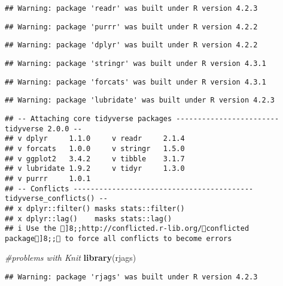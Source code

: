\documentclass[
]{article}
\newenvironment{Shaded}{\begin{snugshade}}{\end{snugshade}}
\newcommand{\CommentTok}[1]{\textcolor[rgb]{0.56,0.35,0.01}{\textit{#1}}}
\newcommand{\FunctionTok}[1]{\textcolor[rgb]{0.13,0.29,0.53}{\textbf{#1}}}
\newcommand{\NormalTok}[1]{#1}
\newcommand{\StringTok}[1]{\textcolor[rgb]{0.31,0.60,0.02}{#1}}
\begin{document}
\begin{verbatim}
## Warning: package 'readr' was built under R version 4.2.3
\end{verbatim}

\begin{verbatim}
## Warning: package 'purrr' was built under R version 4.2.2
\end{verbatim}

\begin{verbatim}
## Warning: package 'dplyr' was built under R version 4.2.2
\end{verbatim}

\begin{verbatim}
## Warning: package 'stringr' was built under R version 4.3.1
\end{verbatim}

\begin{verbatim}
## Warning: package 'forcats' was built under R version 4.3.1
\end{verbatim}

\begin{verbatim}
## Warning: package 'lubridate' was built under R version 4.2.3
\end{verbatim}

\begin{verbatim}
## -- Attaching core tidyverse packages ------------------------ tidyverse 2.0.0 --
## v dplyr     1.1.0     v readr     2.1.4
## v forcats   1.0.0     v stringr   1.5.0
## v ggplot2   3.4.2     v tibble    3.1.7
## v lubridate 1.9.2     v tidyr     1.3.0
## v purrr     1.0.1     
## -- Conflicts ------------------------------------------ tidyverse_conflicts() --
## x dplyr::filter() masks stats::filter()
## x dplyr::lag()    masks stats::lag()
## i Use the ]8;;http://conflicted.r-lib.org/conflicted package]8;; to force all conflicts to become errors
\end{verbatim}

\begin{Shaded}
\begin{Highlighting}[]
  \CommentTok{\#problems with Knit}
\FunctionTok{library}\NormalTok{(}\StringTok{\textquotesingle{}rjags\textquotesingle{}}\NormalTok{)}
\end{Highlighting}
\end{Shaded}

\begin{verbatim}
## Warning: package 'rjags' was built under R version 4.2.3
\end{verbatim}
\end{document}
